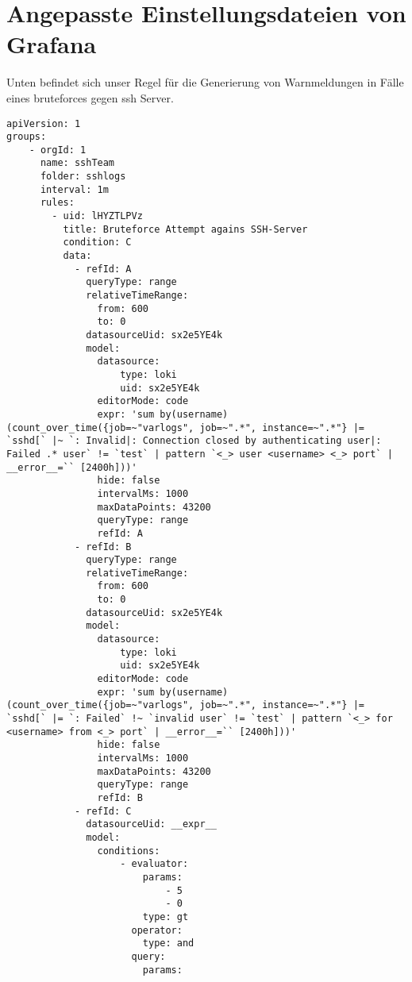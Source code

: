 \section{Angepasste Einstellungsdateien von Grafana}\label{appendix:Warnmedungskonfiguration}

Unten befindet sich unser Regel für die Generierung von Warnmeldungen in Fälle eines \gls{bruteforce}s gegen \gls{ssh} Server.

{
\begin{Verbatim}[frame=single]
apiVersion: 1
groups:
    - orgId: 1
      name: sshTeam
      folder: sshlogs
      interval: 1m
      rules:
        - uid: lHYZTLPVz
          title: Bruteforce Attempt agains SSH-Server
          condition: C
          data:
            - refId: A
              queryType: range
              relativeTimeRange:
                from: 600
                to: 0
              datasourceUid: sx2e5YE4k
              model:
                datasource:
                    type: loki
                    uid: sx2e5YE4k
                editorMode: code
                expr: 'sum by(username) (count_over_time({job=~"varlogs", job=~".*", instance=~".*"} |= `sshd[` |~ `: Invalid|: Connection closed by authenticating user|: Failed .* user` != `test` | pattern `<_> user <username> <_> port` | __error__=`` [2400h]))'
                hide: false
                intervalMs: 1000
                maxDataPoints: 43200
                queryType: range
                refId: A
            - refId: B
              queryType: range
              relativeTimeRange:
                from: 600
                to: 0
              datasourceUid: sx2e5YE4k
              model:
                datasource:
                    type: loki
                    uid: sx2e5YE4k
                editorMode: code
                expr: 'sum by(username) (count_over_time({job=~"varlogs", job=~".*", instance=~".*"} |= `sshd[` |= `: Failed` !~ `invalid user` != `test` | pattern `<_> for <username> from <_> port` | __error__=`` [2400h]))'
                hide: false
                intervalMs: 1000
                maxDataPoints: 43200
                queryType: range
                refId: B
            - refId: C
              datasourceUid: __expr__
              model:
                conditions:
                    - evaluator:
                        params:
                            - 5
                            - 0
                        type: gt
                      operator:
                        type: and
                      query:
                        params:

\end{Verbatim}}
